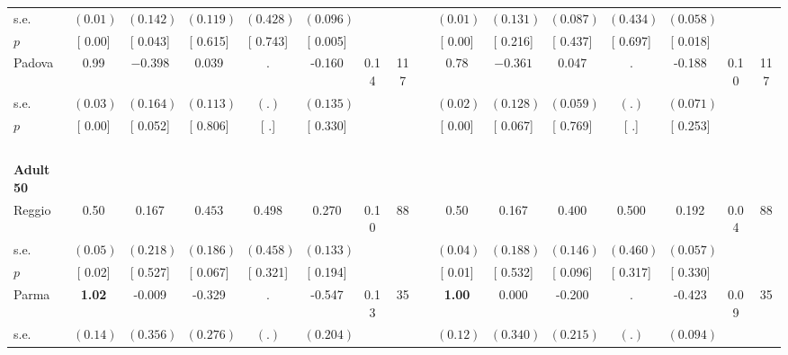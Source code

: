 \begin{longtable}{L{8em} c c c c c c c p{1em} c c c c c c c}
\quad \quad \quad \quad s.e.& $ (     0.01)$ & $ (    0.142)$ & $ (    0.119)$ & $ (    0.428)$ & $ (    0.096)$ & & & & $ (     0.01)$ & $ (    0.131)$ & $ (    0.087)$ & $ (    0.434)$ & $ (    0.058)$ & &  \\*
\quad \quad \quad \quad $ p$ & [     0.00] & [    0.043] & [    0.615] & [    0.743] & [    0.005] & & & & [     0.00] & [    0.216] & [    0.437] & [    0.697] & [    0.018] & &  \\[1em]
\quad \quad \quad Padova& 0.99 & $ \mathbf{   -0.398}$ &     0.039 &         . &    -0.160 &      0.14 &       117 & & 0.78 & $ \mathbf{   -0.361}$ &     0.047 &         . &    -0.188 &      0.10 &       117  \\*
\quad \quad \quad \quad s.e.& $ (     0.03)$ & $ (    0.164)$ & $ (    0.113)$ & $ (        .)$ & $ (    0.135)$ & & & & $ (     0.02)$ & $ (    0.128)$ & $ (    0.059)$ & $ (        .)$ & $ (    0.071)$ & &  \\*
\quad \quad \quad \quad $ p$ & [     0.00] & [    0.052] & [    0.806] & [        .] & [    0.330] & & & & [     0.00] & [    0.067] & [    0.769] & [        .] & [    0.253] & &  \\[1em]
~\\[1em]
\quad \quad \textbf{Adult 50} & & & & & & & & & & & & & & & \\* 
\quad \quad \quad Reggio& 0.50 &     0.167 & $ \mathbf{    0.453}$ &     0.498 &     0.270 &      0.10 &        88 & & 0.50 &     0.167 & $ \mathbf{    0.400}$ &     0.500 &     0.192 &      0.04 &        88  \\*
\quad \quad \quad \quad s.e.& $ (     0.05)$ & $ (    0.218)$ & $ (    0.186)$ & $ (    0.458)$ & $ (    0.133)$ & & & & $ (     0.04)$ & $ (    0.188)$ & $ (    0.146)$ & $ (    0.460)$ & $ (    0.057)$ & &  \\*
\quad \quad \quad \quad $ p$ & [     0.02] & [    0.527] & [    0.067] & [    0.321] & [    0.194] & & & & [     0.01] & [    0.532] & [    0.096] & [    0.317] & [    0.330] & &  \\[1em]
\quad \quad \quad Parma& \textbf{     1.02} &    -0.009 &    -0.329 &         . &    -0.547 &      0.13 &        35 & & \textbf{     1.00} &     0.000 &    -0.200 &         . &    -0.423 &      0.09 &        35  \\*
\quad \quad \quad \quad s.e.& $ (     0.14)$ & $ (    0.356)$ & $ (    0.276)$ & $ (        .)$ & $ (    0.204)$ & & & & $ (     0.12)$ & $ (    0.340)$ & $ (    0.215)$ & $ (        .)$ & $ (    0.094)$ & &  \\*

\end{longtable}
